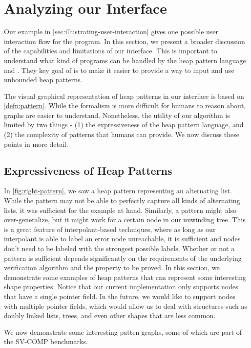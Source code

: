 \section{Analyzing our Interface}
Our example in \autoref{sec:illustrating-user-interaction} gives one possible user
interaction flow for the \altlistsimplified program. In this section, we present a
broader discussion of the capabilities and limitations of our interface. This is
important to understand what kind of programs can be handled by the heap pattern
language and \verifier. They key goal of \verifier is to make it easier to provide a way
to input and use unbounded heap patterns.

The visual graphical representation of heap patterns in our interface is based on
\autoref{defn:pattern}. While the formalism is more difficult for humans to reason
about, graphs are easier to understand. Nonetheless, the utility of our algorithm is
limited by two things - (1) the expressiveness of the heap pattern language, and (2) the
complexity of patterns that humans can provide. We now discuss these points in more
detail.

\subsection{Expressiveness of Heap Patterns}
\label{sec:expressiveness-of-heap-patterns}
In \autoref{fig:right-pattern}, we saw a heap pattern representing an alternating list.
While the pattern may not be able to perfectly capture all kinds of alternating lists,
it was sufficient for the example at hand. Similarly, a pattern might also
over-generalize, but it might work for a certain node in our unwinding tree. This is a
great feature of interpolant-based techniques, where as long as our interpolant is able
to label an error node unreachable, it is sufficient and nodes don't need to be labeled
with the strongest possible labels. Whether or not a pattern is sufficient depends
significantly on the requirements of the underlying verification algorithm and the
property to be proved. In this section, we demonstrate some examples of heap patterns
that can represent some interesting shape properties. Notice that our current
implementation only supports nodes that have a single pointer field. In the future, we
would like to support nodes with multiple pointer fields, which would allow us to deal
with structures such as doubly linked lists, trees, and even other shapes that are less
common.

We now demonstrate some interesting patten graphs, some of which are part of the SV-COMP
\cite{sv-comp} benchmarks.

